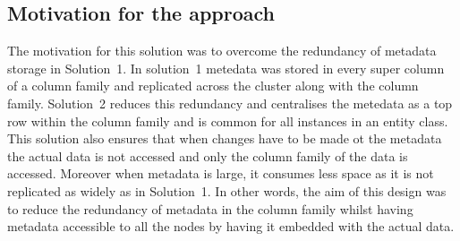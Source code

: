 	\subsection{Motivation for the approach}
	The motivation for this solution was to overcome the redundancy of metadata
	storage in Solution~1. In solution~1 metedata was stored in every super column
	of a column family and replicated across the cluster along with the column
	family. Solution~2 reduces this redundancy and centralises the
	metedata as a top row within the column family and is common for
	all instances in an entity class. This solution also ensures that when changes have to be made ot
	the metadata the actual data is not accessed and only the column family of the
	data is accessed.  Moreover when metadata is large, it
	consumes less space as it is not replicated as widely as in Solution~1. 
	In other words, the aim of this design was to reduce the redundancy of metadata
	in the column family whilst having metadata accessible to all the nodes by
	having it embedded with the actual data.
